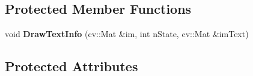 \subsection*{Protected Member Functions}
\begin{DoxyCompactItemize}
\item 
void {\bfseries Draw\+Text\+Info} (cv\+::\+Mat \&im, int n\+State, cv\+::\+Mat \&im\+Text)\hypertarget{classMultiColSLAM_1_1cMultiFramePublisher_a63cd7662080adaf1fb4ebe91e5ade331}{}\label{classMultiColSLAM_1_1cMultiFramePublisher_a63cd7662080adaf1fb4ebe91e5ade331}

\end{DoxyCompactItemize}
\subsection*{Protected Attributes}
